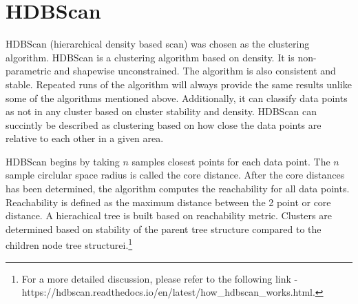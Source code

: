 \documentclass{article}
\begin{document}
\section{HDBScan}
HDBScan (hierarchical density based scan) was chosen as the clustering algorithm. HDBScan is a clustering algorithm based on density. It is non-parametric and shapewise unconstrained. The algorithm is also consistent and stable. Repeated runs of the algorithm will always provide the same results unlike some of the algorithms mentioned above. Additionally, it can classify data points as not in any cluster based on cluster stability and density.  HDBScan can succintly be described as clustering based on how close the data points are relative to each other in a given area.

HDBScan begins by taking $n$ samples closest points for each data point. The $n$ sample circlular space radius is called the core distance. After the core distances has been determined, the algorithm computes the reachability for all data points. Reachability is defined as the maximum distance between the 2 point or core distance. A hierachical tree is built based on reachability metric. Clusters are determined based on stability of the parent tree structure compared to the children node tree structurei.\footnote{For a more detailed discussion, please refer to the following link -  https://hdbscan.readthedocs.io/en/latest/how\_hdbscan\_works.html.}
\end{document}
